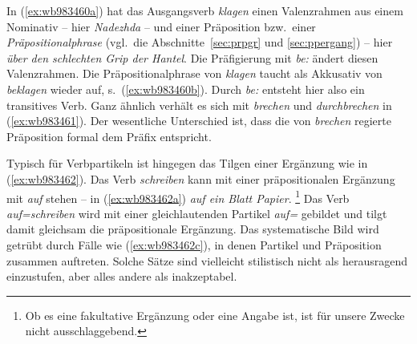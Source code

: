 \begin{exe}
  \ex \label{ex:wb983460}
  \begin{xlist}
  \end{xlist}
  \ex \label{ex:wb983461}
  \begin{xlist}
  \end{xlist}
\end{exe}

In (\ref{ex:wb983460a}) hat das Ausgangsverb \textit{klagen} einen Valenzrahmen aus einem Nominativ -- hier \textit{Nadezhda} -- und einer Präposition bzw.\ einer \textit{Präpositionalphrase} (vgl.\ die Abschnitte~\ref{sec:prpgr} und \ref{sec:ppergang}) -- hier \textit{über den schlechten Grip der Hantel}.
Die Präfigierung mit \textit{be:} ändert diesen Valenzrahmen.
Die Präpositionalphrase von \textit{klagen} taucht als Akkusativ von \textit{beklagen} wieder auf, s.\ (\ref{ex:wb983460b}).
Durch \textit{be:} entsteht hier also ein transitives Verb.
Ganz ähnlich verhält es sich mit \textit{brechen} und \textit{durchbrechen} in (\ref{ex:wb983461}).
Der wesentliche Unterschied ist, dass die von \textit{brechen} regierte Präposition formal dem Präfix entspricht.

Typisch für Verbpartikeln ist hingegen das Tilgen einer Ergänzung wie in (\ref{ex:wb983462}). 
Das Verb \textit{schreiben} kann mit einer präpositionalen Ergänzung mit \textit{auf} stehen -- in (\ref{ex:wb983462a}) \textit{auf ein Blatt Papier}.%
\footnote{Ob es eine fakultative Ergänzung oder eine Angabe ist, ist für unsere Zwecke nicht ausschlaggebend.}
Das Verb \textit{auf=schreiben} wird mit einer gleichlautenden Partikel \textit{auf=} gebildet und tilgt damit gleichsam die präpositionale Ergänzung.
Das systematische Bild wird getrübt durch Fälle wie (\ref{ex:wb983462c}), in denen Partikel und Präposition zusammen auftreten.
Solche Sätze sind vielleicht stilistisch nicht als herausragend einzustufen, aber alles andere als inakzeptabel.

\begin{exe}
  \ex \label{ex:wb983462}
  \begin{xlist}
  \end{xlist}
\end{exe}

